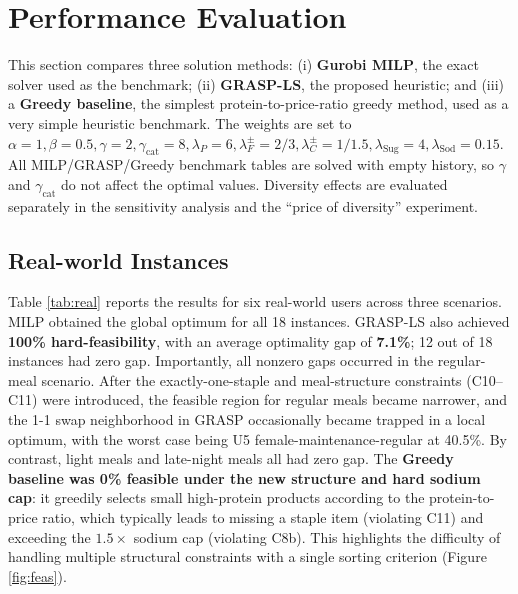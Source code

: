 \documentclass[a4paper]{article}
\begin{document}
\section{Performance Evaluation}\label{sec:exp}
This section compares three solution methods: (i) \textbf{Gurobi MILP}, the exact solver used as the benchmark; (ii) \textbf{GRASP-LS}, the proposed heuristic; and (iii) a \textbf{Greedy baseline}, the simplest protein-to-price-ratio greedy method, used as a very simple heuristic benchmark. The weights are set to $\alpha=1, \beta=0.5, \gamma=2, \gamma_{\text{cat}}=8, \lambda_P=6, \lambda^\pm_F = 2/3, \lambda^\pm_C = 1/1.5, \lambda_{\text{Sug}}=4, \lambda_{\text{Sod}}=0.15$. All MILP/GRASP/Greedy benchmark tables are solved with empty history, so $\gamma$ and $\gamma_{\text{cat}}$ do not affect the optimal values. Diversity effects are evaluated separately in the sensitivity analysis and the ``price of diversity'' experiment.

\subsection{Real-world Instances}
Table \ref{tab:real} reports the results for six real-world users across three scenarios. MILP obtained the global optimum for all 18 instances. GRASP-LS also achieved \textbf{100\% hard-feasibility}, with an average optimality gap of \textbf{7.1\%}; 12 out of 18 instances had zero gap. Importantly, all nonzero gaps occurred in the regular-meal scenario. After the exactly-one-staple and meal-structure constraints (C10--C11) were introduced, the feasible region for regular meals became narrower, and the 1-1 swap neighborhood in GRASP occasionally became trapped in a local optimum, with the worst case being U5 female-maintenance-regular at 40.5\%. By contrast, light meals and late-night meals all had zero gap. The \textbf{Greedy baseline was 0\% feasible under the new structure and hard sodium cap}: it greedily selects small high-protein products according to the protein-to-price ratio, which typically leads to missing a staple item (violating C11) and exceeding the $1.5\times$ sodium cap (violating C8b). This highlights the difficulty of handling multiple structural constraints with a single sorting criterion (Figure \ref{fig:feas}).
\end{document}
